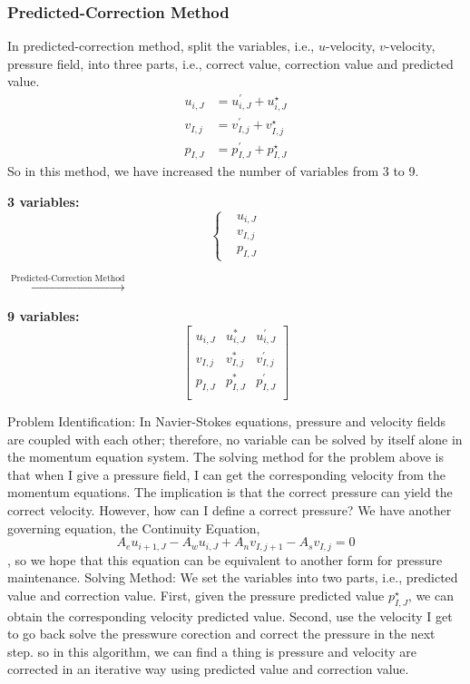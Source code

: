 \documentclass[12pt]{article}
\theoremstyle{plain}  %
\theoremstyle{definition}  %
\begin{document}
\subsubsection{Predicted-Correction Method}
\noindent In predicted-correction method, split the variables, i.e., $u$-velocity, $v$-velocity, pressure field, into three parts, i.e., correct value, correction value and predicted value. 
\begin{equation}\begin{aligned}
    u_{i,J} &= u_{i,J}^{\prime} + u_{i,J}^{\star}\\[1.5ex] 
    v_{I,j} &= v_{I,j}^{\prime} + v_{I,j}^{\star}\\[1.5ex] 
    p_{I,J} &= p_{I,J}^{\prime} + p_{I,J}^{\star}
\end{aligned}\end{equation}
So in this method, we have increased the  number of variables from 3 to 9. 

\begin{center}\begin{minipage}[c]{0.2\textwidth}
    \textbf{3 variables:}
    \[
    \left\{
    \begin{aligned}
        &u_{i,J} \\[1.5ex]
        &v_{I,j} \\[1.5ex]
        &p_{I,J}
    \end{aligned}
    \right.
    \]
\end{minipage}
$\xrightarrow{\text{Predicted-Correction Method}}$
\begin{minipage}[c]{0.2\textwidth}
    \textbf{9 variables:}
    \[
    \begin{bmatrix}
    u_{i,J} & u_{i,J}^{*} & u_{i,J}^{\prime} \\
    v_{I,j} & v_{I,j}^{*} & v_{I,j}^{\prime} \\
    p_{I,J} & p_{I,J}^{*} & p_{I,J}^{\prime} \\
    \end{bmatrix}
    \]
\end{minipage}\end{center}
{\color{blue}Problem Identification: }
\noindent In Navier-Stokes equations, pressure and velocity fields are coupled with each other; therefore, no variable can be solved by itself alone in the momentum equation system. 
The solving method for the problem above is that when I give a pressure field, I can get the corresponding velocity from the momentum equations.
The implication is that the correct pressure can yield the correct velocity. However, how can I define a correct pressure? We have another governing equation, the Continuity Equation,
$$A_{e}u_{i+1,J} - A_{w}u_{i,J} + A_{n}v_{I,j+1} - A_{s}v_{I,j} = 0$$, so we hope that this equation can be equivalent to another form for pressure maintenance. 
{\color{red}Solving Method: }
We set the variables into two parts, i.e., predicted value and correction value. 
First, given the pressure predicted value $p_{I,J}^{\star}$, we can obtain the corresponding velocity predicted value. 
Second, use the velocity I get to go back solve the presswure corection and correct the pressure in the next step.
so in this algorithm, we can find a thing is pressure and velocity are corrected in an iterative way using predicted value and correction value.
\end{document}

